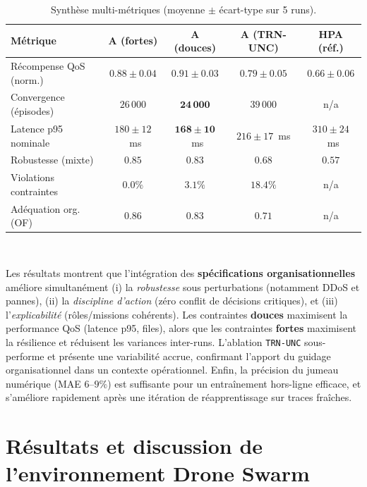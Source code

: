 \begin{table}[h!]
  \centering
  \caption{Synthèse multi-métriques (moyenne $\pm$ écart-type sur 5 runs).}
  \label{tab:k8s_summary}
  \renewcommand{\arraystretch}{1.2}
  \small
  \begin{tabular}{|l|c|c|c|c|}
    \hline
    \textbf{Métrique}      & \textbf{A (fortes)} & \textbf{A (douces)}      & \textbf{A (TRN-UNC)} & \textbf{HPA (réf.)} \\
    \hline
    Récompense QoS (norm.) & $0.88 \pm 0.04$     & $\mathbf{0.91 \pm 0.03}$ & $0.79 \pm 0.05$      & $0.66 \pm 0.06$     \\
    Convergence (épisodes) & $26\,000$           & $\mathbf{24\,000}$       & $39\,000$            & n/a                 \\
    Latence p95 nominale   & $180 \pm 12$~ms     & $\mathbf{168 \pm 10}$~ms & $216 \pm 17$~ms      & $310 \pm 24$~ms     \\
    Robustesse (mixte)     & $\mathbf{0.85}$     & $0.83$                   & $0.68$               & $0.57$              \\
    Violations contraintes & $\mathbf{0.0\%}$    & $3.1\%$                  & $18.4\%$             & n/a                 \\
    Adéquation org. (OF)   & $\mathbf{0.86}$     & $0.83$                   & $0.71$               & n/a                 \\
    \hline
  \end{tabular}
\end{table}

\

Les résultats montrent que l’intégration des \textbf{spécifications organisationnelles} améliore simultanément (i) la \emph{robustesse} sous perturbations (notamment DDoS et pannes), (ii) la \emph{discipline d’action} (zéro conflit de décisions critiques), et (iii) l’\emph{explicabilité} (rôles/missions cohérents).
Les contraintes \textbf{douces} maximisent la performance QoS (latence p95, files), alors que les contraintes \textbf{fortes} maximisent la résilience et réduisent les variances inter-runs.
L’ablation \texttt{TRN-UNC} sous-performe et présente une variabilité accrue, confirmant l’apport du guidage organisationnel dans un contexte opérationnel.
Enfin, la précision du jumeau numérique (MAE $6$--$9\%$) est suffisante pour un entraînement hors-ligne efficace, et s’améliore rapidement après une itération de réapprentissage sur traces fraîches.


\section{Résultats et discussion de l'environnement \textbf{Drone Swarm}}\label{sec:results_and_discussion_drone_swarm}

